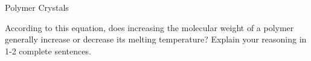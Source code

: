 \begin{activity}{Polymer Crystals}
\begin{exercises}
		According to this equation, does increasing the molecular weight of a polymer generally increase or decrease its melting temperature?  Explain your reasoning in 1-2 complete sentences.
	
\end{exercises}


%
%	


	
\end{activity}